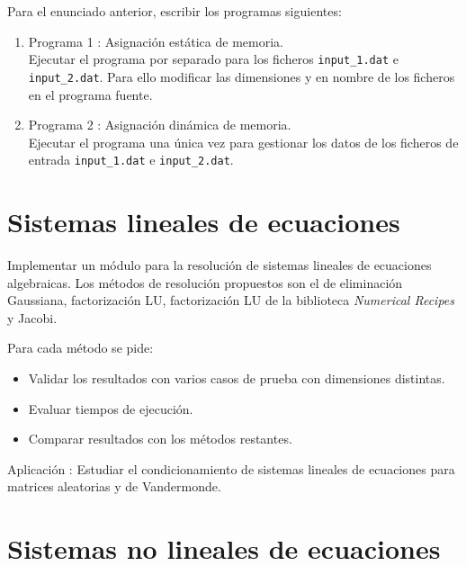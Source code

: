    \vspace{0.5cm}
   
   Para el enunciado anterior, escribir los programas siguientes:
   \begin{enumerate}
    \item Programa 1 : Asignaci\'on est\'atica de memoria.   \\
    Ejecutar el programa por separado para los ficheros \verb|input_1.dat| e 
    \verb|input_2.dat|. Para ello modificar las dimensiones y en nombre de los
    ficheros en el programa fuente.  
    \item Programa 2 : Asignaci\'on din\'amica de memoria.   \\
    Ejecutar el programa una \'unica vez para gestionar los datos de
    los ficheros de entrada \verb|input_1.dat| e \verb|input_2.dat|.      
   \end{enumerate}         
   
   
   
   
   \section{Sistemas lineales de ecuaciones \label{sistemas_lineales} }
   
   Implementar un módulo para la resolución de sistemas lineales de ecuaciones algebraicas.
   Los métodos de resolución propuestos son el de eliminación Gaussiana, factorización LU,
   factorización LU de la biblioteca {\it Numerical Recipes} y Jacobi.
   
   Para cada método se pide:
   \begin{itemize}
    \item Validar los resultados con varios casos de prueba con dimensiones distintas.
    \item Evaluar tiempos de ejecución.
    \item Comparar resultados con los métodos restantes.          
   \end{itemize}
   
   Aplicación : Estudiar el condicionamiento de sistemas lineales de ecuaciones para matrices
   aleatorias y de Vandermonde. 
   
   
   
   
   
   \section{Sistemas no lineales de ecuaciones \label{sistemas_no_lineales} }
   
